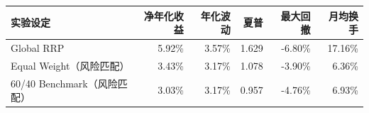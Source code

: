 \begin{tabular}{lrrrrr}
\toprule
实验设定 & 净年化收益 & 年化波动 & 夏普 & 最大回撤 & 月均换手\\\midrule
Global RRP & 5.92\% & 3.57\% & 1.629 & -6.80\% & 17.16\%\\
Equal Weight（风险匹配） & 3.43\% & 3.17\% & 1.078 & -3.90\% & 6.36\%\\
60/40 Benchmark（风险匹配） & 3.03\% & 3.17\% & 0.957 & -4.76\% & 6.93\%\\
\bottomrule
\end{tabular}